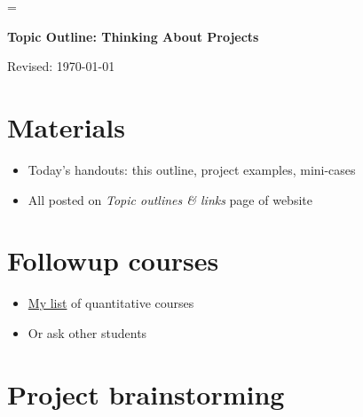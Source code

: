 \documentclass[11pt]{article}
\begin{document}
\parskip=\bigskipamount
\parindent=0.0in
\thispagestyle{empty}


\bigskip\bigskip
\centerline{\Large \bf Topic Outline:  Thinking About Projects}
\centerline{Revised: \today}

\section*{Materials}

\begin{itemize}
\item  Today's handouts:  this outline, project examples, mini-cases
\item  All posted on {\it Topic outlines \& links\/} page of website
\end{itemize}

\section*{Followup courses}

\begin{itemize}
\item \href{https://github.com/DaveBackus/Data_Bootcamp/blob/master/Markdown/related_courses.md}
    {My list}
    of quantitative courses
\item Or ask other students
\end{itemize}

\section*{Project brainstorming}
\end{document}
